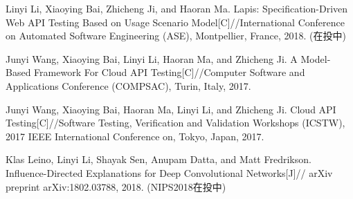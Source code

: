 \begin{resume}


    


  \begin{publications}
    \item Linyi Li, Xiaoying Bai, Zhicheng Ji, and Haoran Ma. Lapis: Specification-Driven Web API Testing Based on Usage Scenario Model[C]//International Conference on Automated Software Engineering (ASE), Montpellier, France, 2018. (在投中)
  
    \item Junyi Wang, Xiaoying Bai, Linyi Li, Haoran Ma, and Zhicheng Ji. A Model-Based Framework For Cloud API Testing[C]//Computer Software and Applications Conference (COMPSAC), Turin, Italy, 2017.
    
    \item Junyi Wang, Xiaoying Bai, Haoran Ma, Linyi Li, and Zhicheng Ji. Cloud API Testing[C]//Software Testing, Verification and Validation Workshops (ICSTW), 2017 IEEE International Conference on, Tokyo, Japan, 2017.
  
    \item  Klas Leino, Linyi Li, Shayak Sen, Anupam Datta, and Matt Fredrikson. Influence-Directed Explanations for Deep Convolutional Networks[J]// arXiv preprint arXiv:1802.03788, 2018. (NIPS2018在投中)
  
  \end{publications}

\end{resume}
